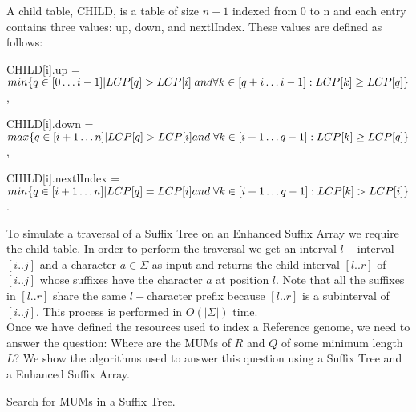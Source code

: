 \documentclass{acm_proc_article-sp}
\begin{document}
\begin{definition}
A child table, CHILD, is a table of size $n+1$ indexed from 0 to n and each entry contains three values: up, down, and nextlIndex. These values are defined as follows: 

CHILD[i].up = $min\{q\in [0\ldots i-1]|LCP[q]>LCP[i]\;and\;\\
\forall k\in[q+i\ldots i-1]:LCP[k]\geq LCP[q]\}$,

CHILD[i].down = $max\{q\in[i+1\ldots n]|LCP[q]>LCP[i]\\
and\;\forall k\in[i+1\ldots q-1]:LCP[k]\geq LCP[q]\}$,

CHILD[i].nextlIndex = $min\{q\in[i+1\ldots n]|LCP[q]=LCP[i]\\
and\;\forall k\in[i+1\ldots q-1]:LCP[k]>LCP[i]\}$.
\end{definition}
To simulate a traversal of a Suffix Tree on an Enhanced Suffix Array we require the child table. In order to perform the traversal we get an interval $l-$interval $[i..j]$ and a character $a\in \Sigma$ as input and returns the child interval $[l..r]$ of $[i..j]$ whose suffixes have the character $a$ at position $l$. Note that all the suffixes in $[l..r]$ share the same $l-$character prefix because $[l..r]$ is a subinterval of $[i..j]$. This process is performed in $O(|\Sigma|)$ time.\\
Once we have defined the resources used to index a Reference genome, we need to answer the question: Where are the MUMs of $R$ and $Q$ of some minimum length $L$? We show the algorithms used to answer this question using a Suffix Tree and a Enhanced Suffix Array.
\linesnumbered
\begin{algorithm}
  \dontprintsemicolon
  \Input{\R, \Q, \Len}
  \caption{Search for MUMs in a Suffix Tree.}
\end{algorithm}
\end{document}
